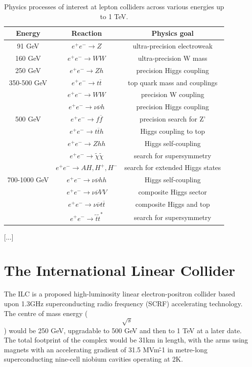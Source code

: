 \begin{table}[h]
\centering
	\begin{tabular}{ c | c | c }
	\hline \hline
	\textbf{Energy} & \textbf{Reaction} & \textbf{Physics goal} \\ \hline
	 91 GeV & $e^+ e^- \rightarrow Z$ & ultra-precision electroweak \\ \hline
	 160 GeV & $e^+ e^- \rightarrow WW$ & ultra-precision W mass \\ \hline
	 250 GeV & $e^+ e^- \rightarrow Zh$ & precision Higgs coupling \\ \hline
	 350-500 GeV & $e^+ e^- \rightarrow t\overline{t}$ & top quark mass and couplings \\
	   & $e^+ e^- \rightarrow WW$ & precision W coupling \\
	   & $e^+ e^- \rightarrow \nu \overline{\nu} h$ & precision Higgs coupling \\ \hline
	 500 GeV & $e^+ e^- \rightarrow f \overline{f}$ & precision search for Z' \\
	   & $e^+ e^- \rightarrow t \overline{t}h$ & Higgs coupling to top \\
	   & $e^+ e^- \rightarrow Zhh$ & Higgs self-coupling \\
	   & $e^+ e^- \rightarrow \widetilde{\chi} \widetilde{\chi}$ & search for supersymmetry \\
	   & $e^+ e^- \rightarrow AH, H^+, H^-$ & search for extended Higgs states \\ \hline
	 700-1000 GeV & $e^+ e^- \rightarrow \nu \overline{\nu} hh$ & Higgs self-coupling \\
	   & $e^+ e^- \rightarrow \nu \overline{\nu} VV$ & composite Higgs sector \\
	   & $e^+ e^- \rightarrow  \nu \overline{\nu} t \overline{t}$ & composite Higgs and top \\
	   & $e^+ e^- \rightarrow \tilde{t} \tilde{t}^*$ & search for supersymmetry \\ \hline
	\end{tabular}
	\caption{Physics processes of interest at lepton colliders across various energies up to 1 TeV.}
	\label{table:colliders/physics-goals}
\end{table}

[...]

\section{The International Linear Collider}
The \acrfull{ILC} is a proposed high-luminosity linear electron-positron collider based upon 1.3GHz superconducting radio frequency (SCRF) accelerating technology. The centre of mass energy ($$\sqrt{s}$$) would be 250 GeV, upgradable to 500 GeV and then to 1 TeV at a later date. The total footprint of the complex would be 31km in length, with the arms using magnets with an accelerating gradient of 31.5 MVm\^{-1} in metre-long superconducting nine-cell niobium cavities operating at 2K.

